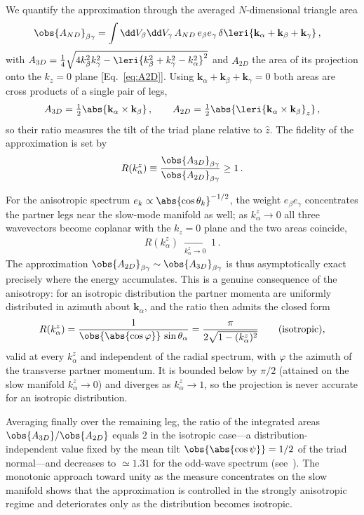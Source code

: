 We quantify the approximation through the averaged $N$-dimensional triangle area
\begin{align}
    \obs{A_{ND}}_{\beta \gamma} &= \int \dd V_\beta \dd V_\gamma \, A_{ND}\, e_\beta e_\gamma\, \delta \leri{\mathbf{k}_\alpha+\mathbf{k}_\beta+\mathbf{k}_\gamma } \,,
\end{align}
with $A_{3D} = \frac{1}{4} \sqrt{4 k_\beta^2 k_\gamma^2-\leri{k_\beta^2 +k_\gamma^2 - k_\alpha^2}^2}$ and $A_{2D}$ the area of its projection onto the $k_z=0$ plane [Eq.~\eqref{eq:A2D}]. Using $\mathbf{k}_\alpha+\mathbf{k}_\beta+\mathbf{k}_\gamma=0$ both areas are cross products of a single pair of legs,
\begin{align}
    A_{3D}=\tfrac12\abs{\mathbf{k}_\alpha\times\mathbf{k}_\beta}\,, \qquad A_{2D}=\tfrac12\abs{\leri{\mathbf{k}_\alpha\times\mathbf{k}_\beta}_z}\,,
\end{align}
so their ratio measures the tilt of the triad plane relative to $\hat z$. The fidelity of the approximation is set by
\begin{align}
    R(k_\alpha^z) \equiv \frac{\obs{A_{3D}}_{\beta \gamma}}{\obs{A_{2D}}_{\beta \gamma}} \geq 1\,.
\end{align}

For the anisotropic spectrum $e_{k}\propto \abs{\cos\theta_k}^{-1/2}$, the weight $e_\beta e_\gamma$ concentrates the partner legs near the slow-mode manifold as well; as $k_\alpha^z\to0$ all three wavevectors become coplanar with the $k_z=0$ plane and the two areas coincide,
\begin{align}
    R(k_\alpha^z)\;\xrightarrow[k_\alpha^z\to0]{}\;1\,.
\end{align}
The approximation $\obs{A_{2D}}_{\beta \gamma}\sim\obs{A_{3D}}_{\beta \gamma}$ is thus asymptotically exact precisely where the energy accumulates. This is a genuine consequence of the anisotropy: for an isotropic distribution the partner momenta are uniformly distributed in azimuth about $\mathbf{k}_\alpha$, and the ratio then admits the closed form
\begin{align}
    R(k_\alpha^z)=\frac{1}{\obs{\abs{\cos\varphi}}\,\sin\theta_\alpha}=\frac{\pi}{2\sqrt{1-(k_\alpha^z)^2}}\qquad(\text{isotropic}),
\end{align}
valid at every $k_\alpha^z$ and independent of the radial spectrum, with $\varphi$ the azimuth of the transverse partner momentum. It is bounded below by $\pi/2$ (attained on the slow manifold $k_\alpha^z\to0$) and diverges as $k_\alpha^z\to1$, so the projection is never accurate for an isotropic distribution.

Averaging finally over the remaining leg, the ratio of the integrated areas $\obs{A_{3D}}/\obs{A_{2D}}$ equals $2$ in the isotropic case---a distribution-independent value fixed by the mean tilt $\obs{\abs{\cos\psi}}=1/2$ of the triad normal---and decreases to $\simeq 1.31$ for the odd-wave spectrum (see~\cite{SM}). The monotonic approach toward unity as the measure concentrates on the slow manifold shows that the approximation is controlled in the strongly anisotropic regime and deteriorates only as the distribution becomes isotropic.
